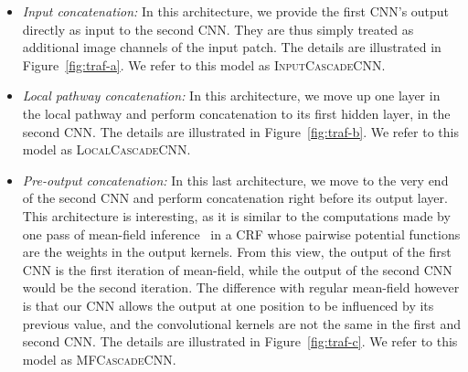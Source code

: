 \documentclass[final,5p,times,twocolumn]{elsarticle}
\newcommand{\PMJ}[1]{\textcolor{green}{\small{}[\textbf{Pierre-Marc:} #1]}}
\begin{document}
\begin{itemize}

\item {\it Input concatenation:} In this architecture, we provide the first CNN's output directly as input to the second CNN. They are thus simply treated as additional image channels of the input patch. The details are illustrated in Figure~\ref{fig:traf-a}. We refer to this model as \textsc{InputCascadeCNN}.

\item {\it Local pathway concatenation:} In this architecture, we move up one layer in the local pathway and perform concatenation to its first hidden layer, in the second CNN. The details are illustrated in Figure~\ref{fig:traf-b}. We refer to this model as  \textsc{LocalCascadeCNN}. %

\item {\it Pre-output concatenation:} In this last architecture, we move to the very end of the second CNN and perform concatenation right before its output layer. This architecture is interesting, as it is similar to the computations made by one pass of mean-field inference~\citep{xing2002} in a CRF whose pairwise potential functions are the weights in the output kernels. From this view, the output of the first CNN is the first iteration of mean-field, while the output of the second CNN would be the second iteration. The difference with regular mean-field however is that our CNN allows the output at one position to be influenced by its previous value, and the convolutional kernels are not the same in the first and second CNN. The details are illustrated in Figure~\ref{fig:traf-c}. We refer to this model as \textsc{MFCascadeCNN}.

\end{itemize}
\end{document}
